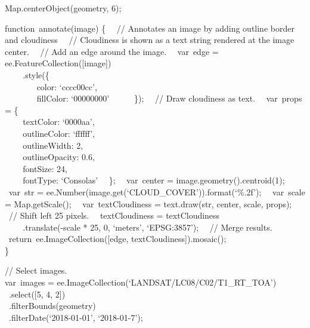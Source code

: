 \documentclass[
  letterpaper,
  DIV=11,
  numbers=noendperiod]{scrreprt}
\begin{document}
Map.centerObject(geometry, 6);

function~annotate(image) \{~ ~// Annotates an image by adding outline
border and cloudiness~ ~// Cloudiness is shown as a text string rendered
at the image center.~ ~// Add an edge around the image.~ ~var~edge =
ee.FeatureCollection({[}image{]})\\
\hspace*{0.333em} ~ ~ ~.style(\{\\
\hspace*{0.333em} ~ ~ ~ ~ ~color: `cccc00cc',\\
\hspace*{0.333em} ~ ~ ~ ~ ~fillColor: `00000000'~ ~ ~ ~\});~ ~// Draw
cloudiness as text.~ ~var~props = \{\\
\hspace*{0.333em} ~ ~ ~textColor: `0000aa',\\
\hspace*{0.333em} ~ ~ ~outlineColor: `ffffff',\\
\hspace*{0.333em} ~ ~ ~outlineWidth: 2,\\
\hspace*{0.333em} ~ ~ ~outlineOpacity: 0.6,\\
\hspace*{0.333em} ~ ~ ~fontSize: 24,\\
\hspace*{0.333em} ~ ~ ~fontType: `Consolas'~ ~\};~ ~var~center =
image.geometry().centroid(1);~ ~var~str =
ee.Number(image.get(`CLOUD\_COVER')).format(`\%.2f');~ ~var~scale =
Map.getScale();~ ~var~textCloudiness = text.draw(str, center, scale,
props);~ ~// Shift left 25 pixels.~ ~textCloudiness = textCloudiness\\
\hspace*{0.333em} ~ ~ ~.translate(-scale * 25, 0, `meters',
`EPSG:3857');~ ~// Merge results.~ ~return~ee.ImageCollection({[}edge,
textCloudiness{]}).mosaic();\\
\}

// Select images.\\
var~images = ee.ImageCollection(`LANDSAT/LC08/C02/T1\_RT\_TOA')\\
\hspace*{0.333em} ~.select({[}5, 4, 2{]})\\
\hspace*{0.333em} ~.filterBounds(geometry)\\
\hspace*{0.333em} ~.filterDate(`2018-01-01', `2018-01-7');
\end{document}
